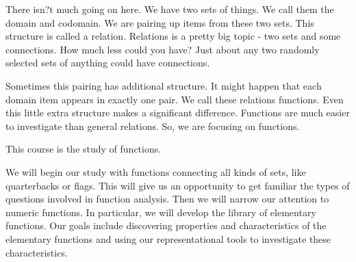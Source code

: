 \documentclass{ximera}
\begin{document}
There isn?t much going on here. We have two sets of things. We call them the domain and codomain. We are pairing up items from these two sets. This structure is called a relation. Relations is a pretty big topic - two sets and some connections. How much less could you have? Just about any two randomly selected sets of anything could have connections.

Sometimes this pairing has additional structure. It might happen that each domain item appears in exactly one pair. We call these relations functions.  Even this little extra structure makes a significant difference. Functions are much easier to investigate than general relations. So, we are focusing on functions.

This course is the study of functions. 

We will begin our study with functions connecting all kinds of sets, like quarterbacks or flags.  This will give us an opportunity to get familiar the types of questions involved in function analysis. Then we will narrow our attention to numeric functions. In particular, we will develop the library of elementary functions. Our goals include discovering properties and characteristics of the elementary functions and using our representational tools to investigate these characteristics.
\end{document}
